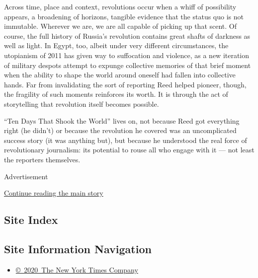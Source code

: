 Across time, place and context, revolutions occur when a whiff of
possibility appears, a broadening of horizons, tangible evidence that
the status quo is not immutable. Wherever we are, we are all capable of
picking up that scent. Of course, the full history of Russia's
revolution contains great shafts of darkness as well as light. In Egypt,
too, albeit under very different circumstances, the utopianism of 2011
has given way to suffocation and violence, as a new iteration of
military despots attempt to expunge collective memories of that brief
moment when the ability to shape the world around oneself had fallen
into collective hands. Far from invalidating the sort of reporting Reed
helped pioneer, though, the fragility of such moments reinforces its
worth. It is through the act of storytelling that revolution itself
becomes possible.

``Ten Days That Shook the World'' lives on, not because Reed got
everything right (he didn't) or because the revolution he covered was an
uncomplicated success story (it was anything but), but because he
understood the real force of revolutionary journalism: its potential to
rouse all who engage with it --- not least the reporters themselves.

Advertisement

\protect\hyperlink{after-bottom}{Continue reading the main story}

\hypertarget{site-index}{%
\subsection{Site Index}\label{site-index}}

\hypertarget{site-information-navigation}{%
\subsection{Site Information
Navigation}\label{site-information-navigation}}

\begin{itemize}
\tightlist
\item
  \href{https://help.nytimes3xbfgragh.onion/hc/en-us/articles/115014792127-Copyright-notice}{©~2020~The
  New York Times Company}
\end{itemize}

